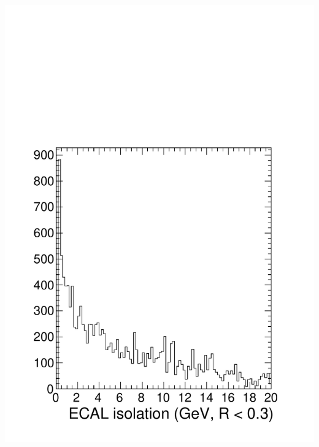 \documentclass[compress]{beamer}
\begin{document}
\begin{frame}
\begin{columns}
\includegraphics[width=\linewidth]{ecaliso_background.pdf}
\end{columns}
\end{frame}
\end{document}
